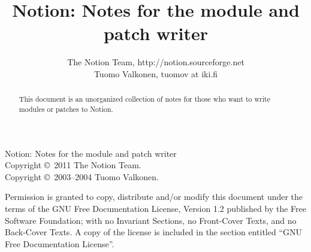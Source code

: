 \documentclass[english,a4paper,11pt,oldtoc,mctitle]{artikel3}
\title{Notion: Notes for the module and patch writer}
\author{The Notion Team, http://notion.sourceforge.net \\ Tuomo Valkonen, tuomov at iki.fi}
\begin{document}
\maketitle

Notion: Notes for the module and patch writer\\
Copyright \copyright\  2011 The Notion Team.\\
Copyright \copyright\  2003--2004 Tuomo Valkonen.

Permission is granted to copy, distribute and/or modify this document
under the terms of the GNU Free Documentation License, Version 1.2
published by the Free Software Foundation;
with no Invariant Sections, no Front-Cover Texts, and no Back-Cover Texts.
A copy of the license is included in the section entitled ``GNU
Free Documentation License''.

\bigskip

\begin{abstract}
    This document is an unorganized collection of notes for
    those who want to write modules or patches to Notion.
\end{abstract}

\tableofcontents











\appendix





\printindex
\end{document}
